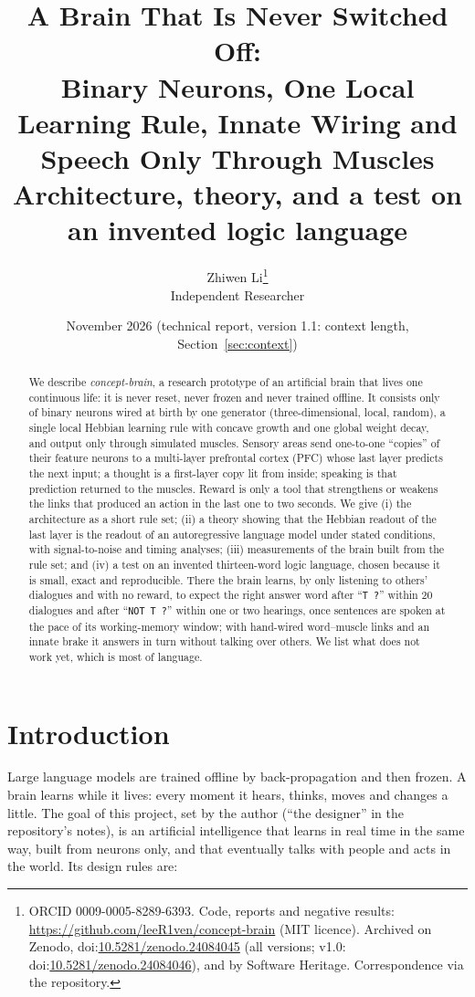 \documentclass[11pt]{article}
\title{A Brain That Is Never Switched Off:\\
Binary Neurons, One Local Learning Rule, Innate Wiring and Speech Only Through Muscles\\[4pt]
\large Architecture, theory, and a test on an invented logic language}
\author{Zhiwen Li\thanks{ORCID 0009-0005-8289-6393. Code, reports and negative results:
\url{https://github.com/leeR1ven/concept-brain} (MIT licence). Archived on Zenodo,
doi:\href{https://doi.org/10.5281/zenodo.24084045}{10.5281/zenodo.24084045} (all versions;
v1.0: doi:\href{https://doi.org/10.5281/zenodo.24084046}{10.5281/zenodo.24084046}), and by Software Heritage.
Correspondence via the repository.}\\
Independent Researcher}
\date{November 2026 \quad (technical report, version 1.1: context length, Section~\ref{sec:context})}
\begin{document}
\maketitle

\begin{abstract}
We describe \emph{concept-brain}, a research prototype of an artificial brain that lives one continuous life: it is
never reset, never frozen and never trained offline. It consists only of binary neurons wired at birth by one
generator (three-dimensional, local, random), a single local Hebbian learning rule with concave growth and one global
weight decay, and output only through simulated muscles. Sensory areas send one-to-one ``copies'' of their feature
neurons to a multi-layer prefrontal cortex (PFC) whose last layer predicts the next input; a thought is a first-layer
copy lit from inside; speaking is that prediction returned to the muscles. Reward is only a tool that strengthens or
weakens the links that produced an action in the last one to two seconds.
We give (i) the architecture as a short rule set; (ii) a theory showing that the Hebbian readout of the last layer is
the readout of an autoregressive language model under stated conditions, with signal-to-noise and timing analyses;
(iii) measurements of the brain built from the rule set; and (iv) a test on an invented thirteen-word logic language,
chosen because it is small, exact and reproducible. There the brain learns,
by only listening to others' dialogues and with no reward, to expect the right answer word after ``\texttt{T ?}'' within
20 dialogues and after ``\texttt{NOT T ?}'' within one or two hearings, once sentences are spoken at the pace of its
working-memory window; with hand-wired word--muscle links and an innate brake it answers in turn without talking over
others. We list what does not work yet, which is most of language.
\end{abstract}

\tableofcontents

\section{Introduction}

Large language models are trained offline by back-propagation and then frozen. A brain learns while it lives: every
moment it hears, thinks, moves and changes a little. The goal of this project, set by the author (``the designer'' in the
repository's notes), is an artificial intelligence that learns in real time in the same way, built from neurons only,
and that eventually talks with people and acts in the world. Its design rules are:
\end{document}
